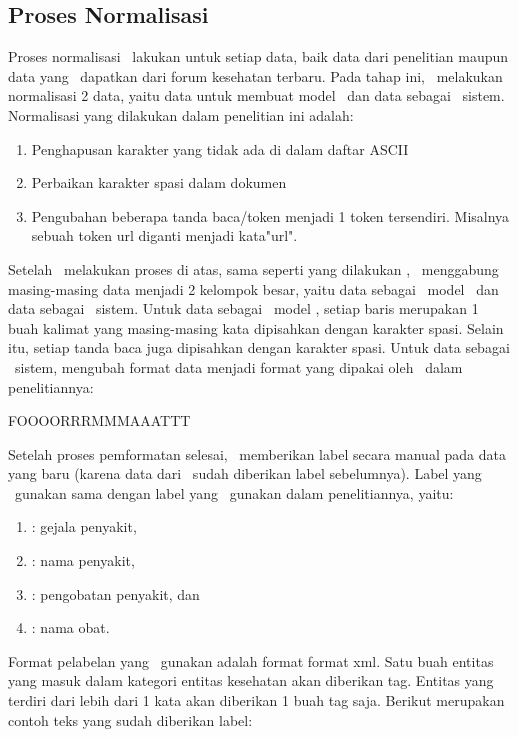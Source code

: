 	\subsection{Proses Normalisasi}
	Proses normalisasi \saya~lakukan untuk setiap data, baik data dari penelitian \cite{skripsiKakRadit} maupun data yang \saya~dapatkan dari forum kesehatan terbaru. Pada tahap ini, \saya~melakukan normalisasi 2 data, yaitu data untuk membuat model \we~dan data sebagai \ioa~sistem. Normalisasi yang dilakukan dalam penelitian ini adalah:
	\begin{enumerate}
		\item Penghapusan karakter yang tidak ada di dalam daftar ASCII
		\item Perbaikan karakter spasi dalam dokumen
		\item Pengubahan beberapa tanda baca/token menjadi 1 token tersendiri. Misalnya sebuah token url diganti menjadi kata"url".
	\end{enumerate}
	
	Setelah \saya~melakukan proses di atas, sama seperti yang dilakukan \skripsiRadit, \saya~menggabung masing-masing data menjadi 2 kelompok besar, yaitu data sebagai \ioa~model \we~dan data sebagai \ioa~sistem. Untuk data sebagai \ioa~model \we, setiap baris merupakan 1 buah kalimat yang masing-masing kata dipisahkan dengan karakter spasi. Selain itu, setiap tanda baca juga dipisahkan dengan karakter spasi. Untuk data sebagai \ioa~sistem, \saya mengubah format data menjadi format yang dipakai oleh \radit~dalam penelitiannya:
	
	FOOOORRRMMMAAATTT
	
	Setelah proses pemformatan selesai, \saya~memberikan label secara manual pada data yang baru (karena data dari \radit~sudah diberikan label sebelumnya). Label yang \saya~gunakan sama dengan label yang \radit~gunakan dalam penelitiannya, yaitu:
	\begin{enumerate}
		\item \symptom: gejala penyakit,
		\item \disease: nama penyakit,
		\item \treatment: pengobatan penyakit, dan
		\item \drug: nama obat.
	\end{enumerate}
	Format pelabelan yang \saya~gunakan adalah format format xml. Satu buah entitas yang  masuk dalam kategori entitas kesehatan akan diberikan tag. Entitas yang terdiri dari lebih dari 1 kata akan diberikan 1 buah tag saja. Berikut merupakan contoh teks yang sudah diberikan label:
	

